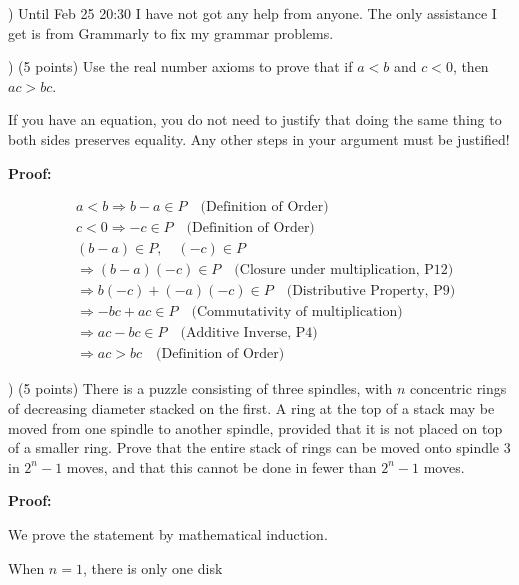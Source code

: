 \documentclass{article}
\begin{document}
) Until Feb 25 20:30 I have not got any help from anyone. The only assistance I get is from Grammarly to fix my grammar problems.

\bigskip

) (5 points) Use the real number axioms to prove that if \( a < b \) and \( c < 0 \), then \( ac > bc \).

\bigskip

\noindent If you have an equation, you do not need to justify that doing the same thing to both sides preserves equality. Any other steps in your argument must be justified!

\bigskip

\noindent \textbf{Proof:}

\begin{align}
    & a < b \Rightarrow b - a \in P  \quad \text{(Definition of Order)} \\
    & c < 0 \Rightarrow -c \in P  \quad \text{(Definition of Order)} \\
    & (b-a) \in P, \quad (-c) \in P \\
    & \Rightarrow (b-a)(-c) \in P  \quad \text{(Closure under multiplication, P12)} \\
    & \Rightarrow b(-c) + (-a)(-c) \in P  \quad \text{(Distributive Property, P9)} \\
    & \Rightarrow -bc + ac \in P  \quad \text{(Commutativity of multiplication)} \\
    & \Rightarrow ac - bc \in P  \quad \text{(Additive Inverse, P4)} \\
    & \Rightarrow ac > bc  \quad \text{(Definition of Order)}
\end{align}

\bigskip
\bigskip
\bigskip
{}) (5 points) There is a puzzle consisting of three spindles, with \( n \) concentric rings of decreasing diameter stacked on the first. A ring at the top of a stack may be moved from one spindle to another spindle, provided that it is not placed on top of a smaller ring. Prove that the entire stack of rings can be moved onto spindle 3 in \( 2^n -1 \) moves, and that this cannot be done in fewer than \( 2^n -1 \) moves.

\bigskip

\noindent \textbf{Proof:}

\bigskip

We prove the statement by mathematical induction.

\text When \( n = 1 \), there is only one disk
\end{document}

